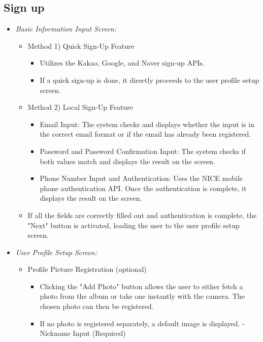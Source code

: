 \documentclass[conference]{IEEEtran}
\begin{document}
\subsection{Sign up}
\begin{itemize}
\item{\emph{Basic Information Input Screen:}}
    \begin{itemize}
        \item Method 1) Quick Sign-Up Feature
        \begin{itemize}
            \item Utilizes the Kakao, Google, and Naver sign-up APIs.
            \item If a quick sign-up is done, it directly proceeds to the user profile setup screen.
        \end{itemize}
        \item Method 2) Local Sign-Up Feature
        \begin{itemize}
            \item Email Input: The system checks and displays whether the input is in the correct email format or if the email has already been registered.
            \item Password and Password Confirmation Input: The system checks if both values match and displays the result on the screen.
            \item Phone Number Input and Authentication: Uses the NICE mobile phone authentication API. Once the authentication is complete, it displays the result on the screen.
        \end{itemize}
        \item If all the fields are correctly filled out and authentication is complete, the "Next" button is activated, leading the user to the user profile setup screen. \newline 
    \end{itemize}
\item{\emph{User Profile Setup Screen:}}
    \begin{itemize}
        \item Profile Picture Registration (optional)
            \begin{itemize}
            \item Clicking the "Add Photo" button allows the user to either fetch a photo from the album or take one instantly with the camera. The chosen photo can then be registered.
            \item If no photo is registered separately, a default image is displayed. - Nickname Input (Required)

\end{itemize}
\end{itemize}
\end{itemize}
\end{document}
